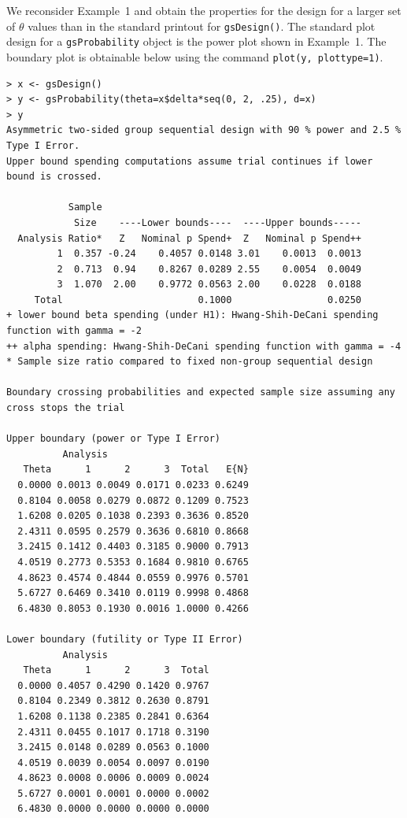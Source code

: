 We reconsider Example~1 and obtain the properties for the design for a larger
set of $\theta$ values than in the standard printout for \texttt{gsDesign()}.
The standard plot design for a \texttt{gsProbability} object is the power plot 
shown in Example~1. The boundary plot is obtainable below using the command
\texttt{plot(y, plottype=1)}.

\bigskip

\begin{verbatim}
> x <- gsDesign()
> y <- gsProbability(theta=x$delta*seq(0, 2, .25), d=x)
> y 
Asymmetric two-sided group sequential design with 90 % power and 2.5 % Type I Error.
Upper bound spending computations assume trial continues if lower bound is crossed.

           Sample
            Size    ----Lower bounds----  ----Upper bounds-----
  Analysis Ratio*   Z   Nominal p Spend+  Z   Nominal p Spend++
         1  0.357 -0.24    0.4057 0.0148 3.01    0.0013  0.0013
         2  0.713  0.94    0.8267 0.0289 2.55    0.0054  0.0049
         3  1.070  2.00    0.9772 0.0563 2.00    0.0228  0.0188
     Total                        0.1000                 0.0250 
+ lower bound beta spending (under H1): Hwang-Shih-DeCani spending function with gamma = -2
++ alpha spending: Hwang-Shih-DeCani spending function with gamma = -4
* Sample size ratio compared to fixed non-group sequential design

Boundary crossing probabilities and expected sample size assuming any cross stops the trial

Upper boundary (power or Type I Error)
          Analysis
   Theta      1      2      3  Total   E{N}
  0.0000 0.0013 0.0049 0.0171 0.0233 0.6249
  0.8104 0.0058 0.0279 0.0872 0.1209 0.7523
  1.6208 0.0205 0.1038 0.2393 0.3636 0.8520
  2.4311 0.0595 0.2579 0.3636 0.6810 0.8668
  3.2415 0.1412 0.4403 0.3185 0.9000 0.7913
  4.0519 0.2773 0.5353 0.1684 0.9810 0.6765
  4.8623 0.4574 0.4844 0.0559 0.9976 0.5701
  5.6727 0.6469 0.3410 0.0119 0.9998 0.4868
  6.4830 0.8053 0.1930 0.0016 1.0000 0.4266

Lower boundary (futility or Type II Error)
          Analysis
   Theta      1      2      3  Total
  0.0000 0.4057 0.4290 0.1420 0.9767
  0.8104 0.2349 0.3812 0.2630 0.8791
  1.6208 0.1138 0.2385 0.2841 0.6364
  2.4311 0.0455 0.1017 0.1718 0.3190
  3.2415 0.0148 0.0289 0.0563 0.1000
  4.0519 0.0039 0.0054 0.0097 0.0190
  4.8623 0.0008 0.0006 0.0009 0.0024
  5.6727 0.0001 0.0001 0.0000 0.0002
  6.4830 0.0000 0.0000 0.0000 0.0000
\end{verbatim}

